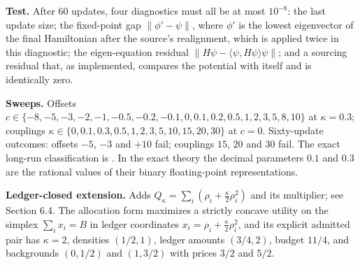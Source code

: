 \textbf{Test.} After 60 updates, four diagnostics must all be at most
\(10^{-8}\): the last update size; the fixed-point gap
\(\|\phi'-\psi\|\), where \(\phi'\) is the lowest eigenvector of the
final Hamiltonian after the source's realignment, which is applied twice
in this diagnostic; the eigen-equation residual
\(\|H\psi-\langle\psi,H\psi\rangle\psi\|\); and a sourcing residual
that, as implemented, compares the potential with itself and is
identically zero.

\textbf{Sweeps.} Offsets
\(c\in\{-8,-5,-3,-2,-1,-0.5,-0.2,-0.1,0,0.1,0.2,0.5,1,2,3,5,8,10\}\) at
\(\kappa=0.3\); couplings
\(\kappa\in\{0,0.1,0.3,0.5,1,2,3,5,10,15,20,30\}\) at \(c=0\).
Sixty-update outcomes: offsets \(-5\), \(-3\) and \(+10\) fail;
couplings \(15\), \(20\) and \(30\) fail. The exact long-run
classification is . In the exact theory the decimal
parameters \(0.1\) and \(0.3\) are the rational values of their binary
floating-point representations.

\textbf{Ledger-closed extension.} Adds
\(Q_\kappa=\sum_i(\rho_i+\tfrac\kappa2\rho_i^2)\) and its multiplier;
see Section 6.4. The allocation form maximizes a strictly concave
utility on the simplex \(\sum_ix_i=B\) in ledger coordinates
\(x_i=\rho_i+\tfrac\kappa2\rho_i^2\), and its explicit admitted pair has
\(\kappa=2\), densities \((1/2,1)\), ledger amounts \((3/4,2)\), budget
\(11/4\), and backgrounds \((0,1/2)\) and \((1,3/2)\) with prices
\(3/2\) and \(5/2\).

